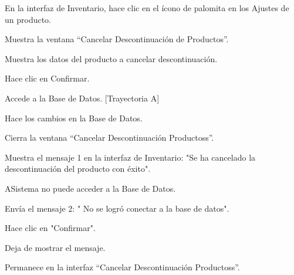 \begin{UCtrayectoria}
	
	\UCpaso[\UCactor] En la interfaz de Inventario, hace clic en el ícono de palomita en los Ajustes de un producto.

	\UCpaso[\UCsist] Muestra la ventana “Cancelar Descontinuación de Productos”.

	\UCpaso[\UCsist] Muestra los datos del producto a cancelar descontinuación.

	\UCpaso[\UCactor] Hace clic en Confirmar.

	\UCpaso[\UCsist] Accede a la Base de Datos. [Trayectoria A]

	\UCpaso[\UCsist] Hace los cambios en la Base de Datos.

	\UCpaso[\UCsist] Cierra la ventana “Cancelar Descontinuación Productoss”.

	\UCpaso[\UCsist] Muestra el mensaje 1 en la interfaz de Inventario: "Se ha cancelado la descontinuación del producto con éxito".
	
\end{UCtrayectoria}

\begin{UCtrayectoriaA}{A}{Sistema no puede acceder a la Base de Datos.}
	
	\UCpaso[\UCsist] Envía el mensaje 2: " No se logró conectar a la base de datos".
	
	\UCpaso[\UCactor] Hace clic en "Confirmar".

	\UCpaso[\UCsist] Deja de mostrar el mensaje.

	\UCpaso[] Permanece en la interfaz “Cancelar Descontinuación Productoss”.

\end{UCtrayectoriaA}
